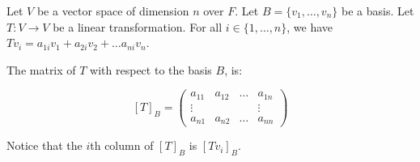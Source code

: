 \begin{definition} Let $V$ be a vector space of dimension $n$ over $F$. Let $B = \{v_1,\dots,v_n\}$ be a basis. Let $T : V \to V$ be a linear transformation. For all $i \in \{1,\dots,n\}$, we have $Tv_i = a_{1i}v_1 + a_{2i}v_2 + \dots a_{ni}v_n$.

\noindent The matrix of $T$ with respect to the basis $B$, is:

\[[T]_B = \begin{pmatrix}
 a_{11} & a_{12} & \dots & a_{1n}\\
 \vdots & &  & \vdots \\
 a_{n1} & a_{n2} & \dots & a_{nn}
 \end{pmatrix}
\]
\end{definition}

Notice that the $i$th column of $[T]_B$ is $[Tv_i]_B$.\\


